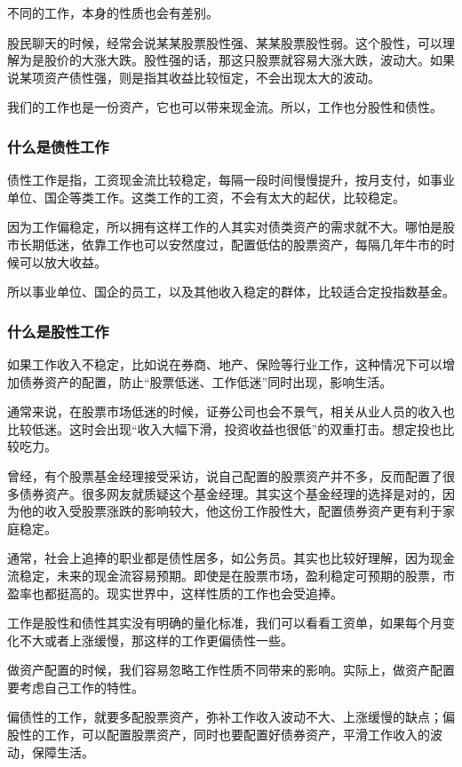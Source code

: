 不同的工作，本身的性质也会有差别。

股民聊天的时候，经常会说某某股票股性强、某某股票股性弱。这个股性，可以理解为是股价的大涨大跌。股性强的话，那这只股票就容易大涨大跌，波动大。如果说某项资产债性强，则是指其收益比较恒定，不会出现太大的波动。

我们的工作也是一份资产，它也可以带来现金流。所以，工作也分股性和债性。

\subsubsection{什么是债性工作}

债性工作是指，工资现金流比较稳定，每隔一段时间慢慢提升，按月支付，如事业单位、国企等类工作。这类工作的工资，不会有太大的起伏，比较稳定。

因为工作偏稳定，所以拥有这样工作的人其实对债类资产的需求就不大。哪怕是股市长期低迷，依靠工作也可以安然度过，配置低估的股票资产，每隔几年牛市的时候可以放大收益。

所以事业单位、国企的员工，以及其他收入稳定的群体，比较适合定投指数基金。

\subsubsection{什么是股性工作}

如果工作收入不稳定，比如说在券商、地产、保险等行业工作，这种情况下可以增加债券资产的配置，防止“股票低迷、工作低迷”同时出现，影响生活。

通常来说，在股票市场低迷的时候，证券公司也会不景气，相关从业人员的收入也比较低迷。这时会出现“收入大幅下滑，投资收益也很低”的双重打击。想定投也比较吃力。

曾经，有个股票基金经理接受采访，说自己配置的股票资产并不多，反而配置了很多债券资产。很多网友就质疑这个基金经理。其实这个基金经理的选择是对的，因为他的收入受股票涨跌的影响较大，他这份工作股性大，配置债券资产更有利于家庭稳定。

通常，社会上追捧的职业都是债性居多，如公务员。其实也比较好理解，因为现金流稳定，未来的现金流容易预期。即使是在股票市场，盈利稳定可预期的股票，市盈率也都挺高的。现实世界中，这样性质的工作也会受追捧。

工作是股性和债性其实没有明确的量化标准，我们可以看看工资单，如果每个月变化不大或者上涨缓慢，那这样的工作更偏债性一些。

做资产配置的时候，我们容易忽略工作性质不同带来的影响。实际上，做资产配置要考虑自己工作的特性。

偏债性的工作，就要多配股票资产，弥补工作收入波动不大、上涨缓慢的缺点；偏股性的工作，可以配置股票资产，同时也要配置好债券资产，平滑工作收入的波动，保障生活。

